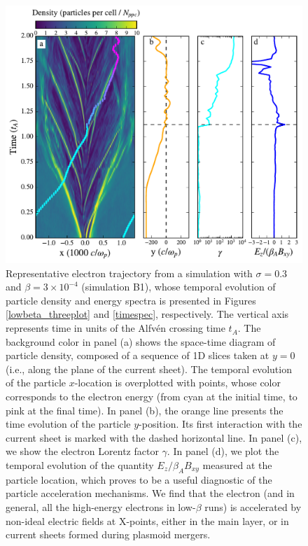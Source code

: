 \begin{figure}[!t]
\centering
\includegraphics[width =\textwidth]{lowbeta_lec.pdf}
\caption{Representative electron trajectory from a simulation with $\sigma=0.3$ and $\beta=3\times 10^{-4}$ (simulation B1), whose temporal evolution of particle density and energy spectra is presented in  Figures \ref{lowbeta_threeplot} and \ref{timespec}, respectively. The vertical axis represents time in units of the Alfv\'en crossing time $t_A$.
The background color in panel (a) shows the space-time diagram of  particle density, composed of a sequence of 1D slices taken at $y=0$ (i.e., along the plane of the current sheet). The temporal evolution of the particle $x$-location is overplotted with points, whose color corresponds to the electron energy (from cyan at the initial time, to pink at the final time). In panel (b), the orange line presents the time evolution of the particle $y$-position. Its first interaction with the current sheet is marked with the dashed horizontal line. In panel (c), we show the electron Lorentz factor $\gamma$.  In panel (d), we plot the temporal evolution of the quantity $E_{z}/\beta_{A}B_{xy}$ measured at the particle location, which proves to be a useful diagnostic of the particle acceleration mechanisms. We find that the electron (and in general, all the high-energy electrons in low-$\beta$ runs) is accelerated by non-ideal electric fields at X-points, either in the main layer, or in current sheets formed during plasmoid mergers.}
\label{lowbeta_prtl}
\end{figure}

